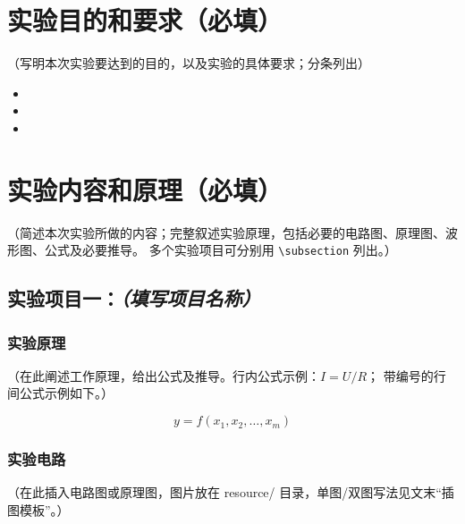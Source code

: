 \documentclass[UTF8,AutoFakeBold]{article}%
\begin{document}
\section{实验目的和要求（必填）}
（写明本次实验要达到的目的，以及实验的具体要求；分条列出）

\begin{itemize}
  \item 
  \item 
  \item 
\end{itemize}

\section{实验内容和原理（必填）}
（简述本次实验所做的内容；完整叙述实验原理，包括必要的电路图、原理图、波形图、公式及必要推导。
多个实验项目可分别用 \verb|\subsection| 列出。）

\subsection{实验项目一：\textit{（填写项目名称）}}

\subsubsection{实验原理}
（在此阐述工作原理，给出公式及推导。行内公式示例：$I = U/R$；
带编号的行间公式示例如下。）

\begin{equation}
    y = f(x_1,x_2,\dots,x_m)
    \label{eq:example}
\end{equation}

\subsubsection{实验电路}
（在此插入电路图或原理图，图片放在 resource/ 目录，单图/双图写法见文末“插图模板”。）


\end{document}
